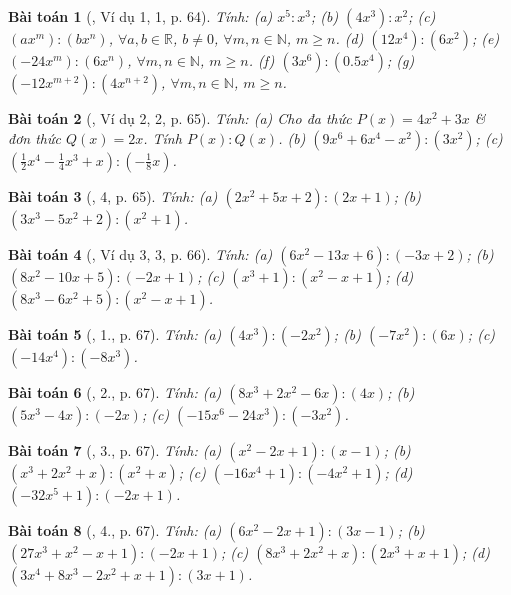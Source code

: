 \documentclass{article}
\newtheorem{baitoan}{Bài toán}
\begin{document}
\begin{baitoan}[\cite{SGK_Toan_7_Canh_Dieu_tap_2}, Ví dụ 1, 1, p. 64]
	Tính: (a) $x^5:x^3$; (b) $(4x^3):x^2$; (c) $(ax^m):(bx^n)$, $\forall a,b\in\mathbb{R}$, $b\ne0$, $\forall m,n\in\mathbb{N}$, $m\ge n$. (d) $(12x^4):(6x^2)$; (e) $(-24x^m):(6x^n)$, $\forall m,n\in\mathbb{N}$, $m\ge n$. (f) $(3x^6):(0.5x^4)$; (g) $(-12x^{m+2}):(4x^{n+2})$, $\forall m,n\in\mathbb{N}$, $m\ge n$.
\end{baitoan}

\begin{baitoan}[\cite{SGK_Toan_7_Canh_Dieu_tap_2}, Ví dụ 2, 2, p. 65]
	Tính: (a) Cho đa thức $P(x) = 4x^2 + 3x$ \& đơn thức $Q(x) = 2x$. Tính $P(x):Q(x)$. (b) $(9x^6 + 6x^4 - x^2):(3x^2)$; (c) $\left(\frac{1}{2}x^4 - \frac{1}{4}x^3 + x\right):\left(-\frac{1}{8}x\right)$.
\end{baitoan}

\begin{baitoan}[\cite{SGK_Toan_7_Canh_Dieu_tap_2}, 4, p. 65]
	Tính: (a) $(2x^2 + 5x + 2):(2x + 1)$; (b) $(3x^3 - 5x^2 + 2):(x^2 + 1)$.
\end{baitoan}

\begin{baitoan}[\cite{SGK_Toan_7_Canh_Dieu_tap_2}, Ví dụ 3, 3, p. 66]
	Tính: (a) $(6x^2 - 13x + 6):(-3x + 2)$; (b) $(8x^2 - 10x + 5):(-2x + 1)$; (c) $(x^3 + 1):(x^2 - x + 1)$; (d) $(8x^3 - 6x^2 + 5):(x^2 - x + 1)$.
\end{baitoan}

\begin{baitoan}[\cite{SGK_Toan_7_Canh_Dieu_tap_2}, 1., p. 67]
	Tính: (a) $(4x^3):(-2x^2)$; (b) $(-7x^2):(6x)$; (c) $(-14x^4):(-8x^3)$.
\end{baitoan}

\begin{baitoan}[\cite{SGK_Toan_7_Canh_Dieu_tap_2}, 2., p. 67]
	Tính: (a) $(8x^3 + 2x^2 - 6x):(4x)$; (b) $(5x^3 - 4x):(-2x)$; (c) $(-15x^6 - 24x^3):(-3x^2)$.
\end{baitoan}

\begin{baitoan}[\cite{SGK_Toan_7_Canh_Dieu_tap_2}, 3., p. 67]
	Tính: (a) $(x^2 - 2x + 1):(x - 1)$; (b) $(x^3 + 2x^2 + x):(x^2 + x)$; (c) $(-16x^4 + 1):(-4x^2 + 1)$; (d) $(-32x^5 + 1):(-2x + 1)$.
\end{baitoan}

\begin{baitoan}[\cite{SGK_Toan_7_Canh_Dieu_tap_2}, 4., p. 67]
	Tính: (a) $(6x^2 - 2x + 1):(3x - 1)$; (b) $(27x^3 + x^2 - x + 1):(-2x + 1)$; (c) $(8x^3 + 2x^2 + x):(2x^3 + x + 1)$; (d) $(3x^4 + 8x^3 - 2x^2 + x + 1):(3x + 1)$.
\end{baitoan}
\end{document}
